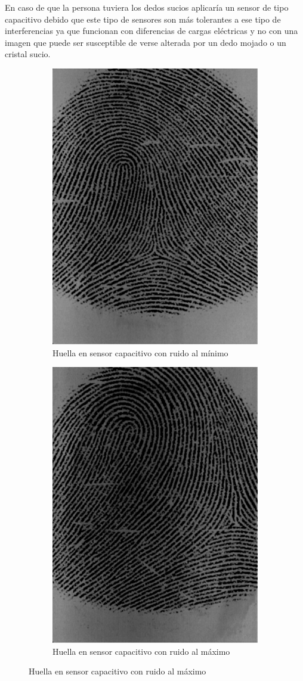 \documentclass[10pt,a4paper]{article}
\begin{document}
En caso de que la persona tuviera los dedos sucios aplicaría un sensor de tipo capacitivo debido que este tipo de sensores son más tolerantes a ese tipo de interferencias ya que funcionan con diferencias de cargas eléctricas y no con una imagen que puede ser susceptible de verse alterada por un dedo mojado o un cristal sucio.
\pagebreak
\begin{figure}[h!]
\centering
\begin{subfigure}{.5\textwidth}
  \centering
  \includegraphics[width=.7\linewidth]{1.3/capacitive_min.png}
  \caption{Huella en sensor capacitivo con ruido al mínimo}
  \label{fig:capac_min}
\end{subfigure}%
\begin{subfigure}{.5\textwidth}
  \centering
  \includegraphics[width=.7\linewidth]{1.3/capacitive_max.png}
  \caption{Huella en sensor capacitivo con ruido al máximo}
  \label{fig:capac_max}
\end{subfigure}


\end{figure}
\end{document}
